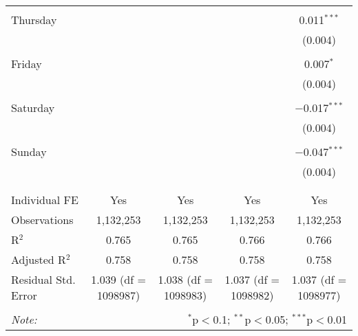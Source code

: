 \documentclass[
]{article}
\begin{document}
\begin{table}[!htbp]
{\begin{tabular}{@{\extracolsep{5pt}}lcccc}
  & & & & \\ 
 Thursday &  &  &  & 0.011$^{***}$ \\ 
  &  &  &  & (0.004) \\ 
  & & & & \\ 
 Friday &  &  &  & 0.007$^{*}$ \\ 
  &  &  &  & (0.004) \\ 
  & & & & \\ 
 Saturday &  &  &  & $-$0.017$^{***}$ \\ 
  &  &  &  & (0.004) \\ 
  & & & & \\ 
 Sunday &  &  &  & $-$0.047$^{***}$ \\ 
  &  &  &  & (0.004) \\ 
  & & & & \\ 
\hline \\[-1.8ex] 
Individual FE & Yes & Yes & Yes & Yes \\ 
Observations & 1,132,253 & 1,132,253 & 1,132,253 & 1,132,253 \\ 
R$^{2}$ & 0.765 & 0.765 & 0.766 & 0.766 \\ 
Adjusted R$^{2}$ & 0.758 & 0.758 & 0.758 & 0.758 \\ 
Residual Std. Error & 1.039 (df = 1098987) & 1.038 (df = 1098983) & 1.037 (df = 1098982) & 1.037 (df = 1098977) \\ 
\hline 
\hline \\[-1.8ex] 
\textit{Note:}  & \multicolumn{4}{r}{$^{*}$p$<$0.1; $^{**}$p$<$0.05; $^{***}$p$<$0.01} \\ 
\end{tabular}
} 
\end{table} 
\newpage
\end{document}
